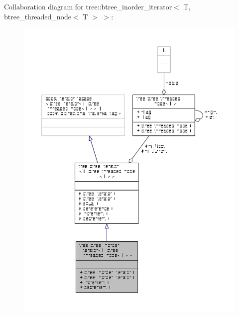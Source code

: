 Collaboration diagram for tree\-:\-:btree\-\_\-inorder\-\_\-iterator$<$ T, btree\-\_\-threaded\-\_\-node$<$ T $>$ $>$\-:
\nopagebreak
\begin{figure}[H]
\begin{center}
\leavevmode
\includegraphics[width=350pt]{classtree_1_1btree__inorder__iterator_3_01T_00_01btree__threaded__node_3_01T_01_4_01_4__coll__graph}
\end{center}
\end{figure}
